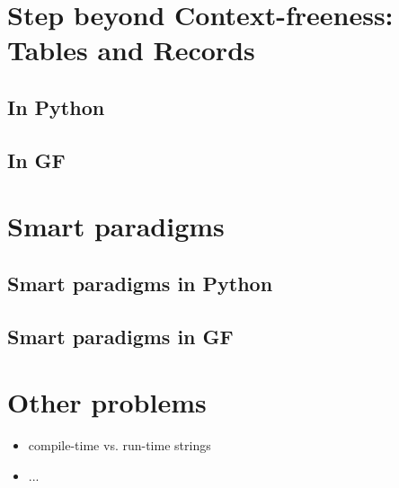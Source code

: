 \documentclass{scrartcl}
\begin{document}
\section{Step beyond Context-freeness: Tables and Records}
\subsection{In Python}
\subsection{In GF}
\section{Smart paradigms}
\subsection{Smart paradigms in Python}
\subsection{Smart paradigms in GF}
\section{Other problems}
\begin{itemize}
\item compile-time vs. run-time strings
\item ...
\end{itemize}
\end{document}
